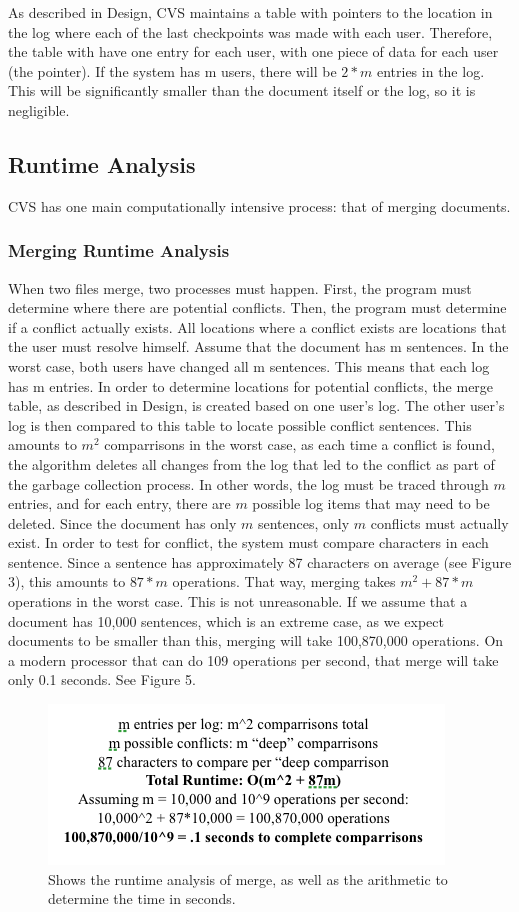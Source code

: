 As described in Design, CVS maintains a table with pointers to the location in the log where each of the last checkpoints was made with each user.  Therefore, the table with have one entry for each user, with one piece of data for each user (the pointer).  If the system has m users, there will be $2*m$ entries in the log.  This will be significantly smaller than the document itself or the log, so it is negligible.




\subsection{Runtime Analysis}

CVS has one main computationally intensive process: that of merging documents.

\subsubsection{Merging Runtime Analysis}

When two files merge, two processes must happen.  First, the program must determine where there are potential conflicts.  Then, the program must determine if a conflict actually exists.  All locations where a conflict exists are locations that the user must resolve himself.  Assume that the document has m sentences.  In the worst case, both users have changed all m sentences.  This means that each log has m entries.  In order to determine locations for potential conflicts, the merge table, as described in Design, is created based on one user's log.  The other user's log is then compared to this table to locate possible conflict sentences.  This amounts to $m^2$ comparrisons in the worst case, as each time a conflict is found, the algorithm deletes all changes from the log that led to the conflict as part of the garbage collection process.  In other words, the log must be traced through $m$ entries, and for each entry, there are $m$ possible log items that may need to be deleted.  Since the document has only $m$ sentences, only $m$ conflicts must actually exist.  In order to test for conflict, the system must compare characters in each sentence.  Since a sentence has approximately 87 characters on average (see Figure 3), this amounts to $87*m$ operations.  That way, merging takes $m^2 + 87*m$ operations in the worst case.  This is not unreasonable.  If we assume that a document has 10,000 sentences, which is an extreme case, as we expect documents to be smaller than this, merging will take 100,870,000 operations.  On a modern processor that can do 109 operations per second, that merge will take only 0.1 seconds.  See Figure 5.

\begin{figure}
\begin{center}
\includegraphics[scale=0.55]{analysis_figure_3.png}
\end{center}
\caption{Shows the runtime analysis of merge, as well as the arithmetic to determine the time in seconds.}
\end{figure}
